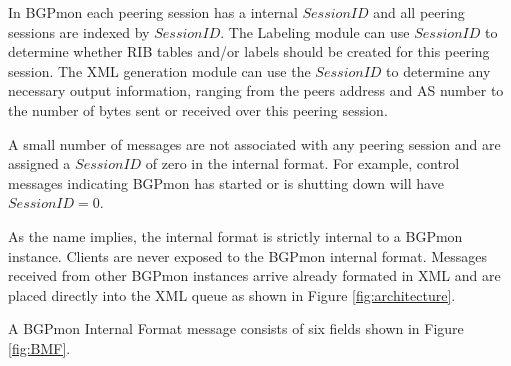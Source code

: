 In BGPmon each peering session has a internal $SessionID$ and all peering sessions are indexed by $SessionID$. The Labeling module can use $SessionID$ to determine whether 
RIB tables and/or labels should be created for this peering session. The XML generation module can use the $SessionID$ to determine any necessary output information, ranging from the peers address and AS number to the number of bytes sent or received over this peering session.



A small number of messages are not associated with any peering session and are assigned a $SessionID$ of zero in the internal format.   For example, control messages indicating BGPmon has started or is shutting down will have $SessionID = 0$.  

As the name implies, the internal format is strictly internal to a BGPmon instance.   Clients are never exposed to the BGPmon internal format.   Messages received from other BGPmon instances arrive already formated in XML and are placed directly into the XML queue as shown in Figure \ref{fig:architecture}.

A BGPmon Internal Format message consists of six fields shown in Figure  \ref{fig:BMF}.


